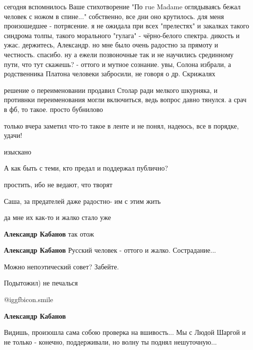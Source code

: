 \begin{itemize}

\obeycr
сегодня вспомнилось Ваше стихотворение "По rue Madame оглядываясь бежал человек с ножом в спине..."
собственно, все дни оно крутилось.
для меня произошедшее - потрясение.
я не ожидала при всех "прелестях" и закалках такого синдрома толпы, такого морального "гулага" - чёрно-белого спектра.
дикость и ужас.
держитесь, Александр.
но мне было очень радостно за прямоту и честность. спасибо.
ну а ежели позвоночные так и не научились срединному пути, что тут скажешь? - оттого и мутное сознание.
увы, Солона избрали, а родственника Платона человеки забросили, не говоря о др. Скрижалях
\restorecr


решение о переименовании продавил Столар ради мелкого шкурняка, и противнки
переименования могли включиться, ведь вопрос давно тянулся. а срач в фб, то
такое. просто бубнилово

только вчера заметил что-то такое в ленте и не понял, надеюсь, все в порядке, удачи!

изыскано

А как быть с теми, кто предал и поддержал публично?

простить, ибо не ведают, что творят


Саша, за предателей даже радостно- им с этим жить

\begin{itemize} %
да мне их как-то и жалко стало уже

\textbf{Александр Кабанов} так отож

\textbf{Александр Кабанов} Русский человек - оттого и жалко. Сострадание...
\end{itemize} %

Можно непоэтический совет? Забейте.

Подытожил) не печалься

\begin{itemize} %
 @igg{fbicon.smile} 

\textbf{Александр Кабанов} 

Видишь, произошла сама собою проверка на вшивость... Мы с Людой Шаргой и не
только - конечно, поддерживали, но волну ты поднял нешуточную...


\end{itemize}
\end{itemize}
